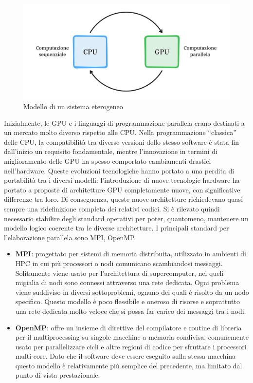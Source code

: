 \begin{figure}[ht]
    \centering
    \includegraphics[width=.9\linewidth]{images/chapter2/het_model2.png}
    \caption{Modello di un sistema eterogeneo}
    \label{fig:het_model}
\end{figure}


Inizialmente, le GPU e i linguaggi di programmazione parallela erano destinati a un mercato molto diverso rispetto alle CPU. Nella programmazione ``classica'' delle CPU, la compatibilità tra diverse versioni dello stesso software è stata fin dall'inizio un requisito fondamentale, mentre l'innovazione in termini di miglioramento delle GPU ha spesso comportato cambiamenti drastici nell'hardware. Queste evoluzioni tecnologiche hanno portato a una perdita di portabilità tra i diversi modelli: l'introduzione di nuove tecnologie hardware ha portato a proposte di architetture GPU completamente nuove, con significative differenze tra loro. Di conseguenza, queste nuove architetture richiedevano quasi sempre una ridefinizione completa dei relativi codici. Si è rilevato quindi necessario stabilire degli standard operativi per poter, quantomeno, mantenere un modello logico coerente tra le diverse architetture.
I principali standard per l'elaborazione parallela sono MPI, OpenMP.

\begin{itemize}
    \item \textbf{MPI}: progettato per sistemi di memoria distribuita, utilizzato in ambienti di HPC in cui più processori o nodi comunicano scambiandosi messaggi. Solitamente viene usato per l'architettura di supercomputer, nei queli migialia di nodi sono connessi attraverso una rete dedicata. Ogni problema viene suddiviso in diversi sottoproblemi, ognuno dei quali è risolto da un nodo specifico. Questo modello è poco flessibile e oneroso di risorse e soprattutto una rete dedicata molto veloce che si possa far carico dei messaggi tra i nodi.
    \item \textbf{OpenMP}: offre un insieme di direttive del compilatore e routine di libreria per il multiprocessing su singole macchine a memoria condivisa, comunemente usato per parallelizzare cicli e altre regioni di codice per sfruttare i processori multi-core. Dato che il software deve essere eseguito sulla stessa macchina questo modello è relativamente più semplice del precedente, ma limitato dal punto di vista prestazionale.
\end{itemize}


